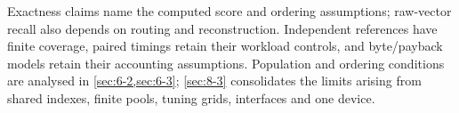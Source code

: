 Exactness claims name the computed score and ordering assumptions;
raw-vector recall also depends on routing and reconstruction. Independent
references have finite coverage, paired timings retain their workload
controls, and byte/payback models retain their accounting assumptions.
Population and ordering conditions are analysed in
\cref{sec:6-2,sec:6-3}; \cref{sec:8-3} consolidates the limits arising
from shared indexes, finite pools, tuning grids, interfaces and one device.
